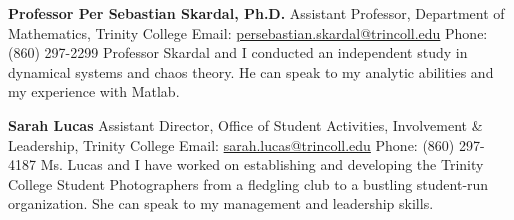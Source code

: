 \documentclass[letterpaper,10pt,oneside]{article}
\newcommand{\CVNote}{Resume compiled on {\today}}
\begin{document}
\begin{body}
\BigGapNoBreak

{\textbf{Professor Per Sebastian Skardal, Ph.D.}}
\hfill
\GapNoBreak
\BulletItem
Assistant Professor, Department of Mathematics, Trinity College
\BulletItem
Email: \href{mailto:persebastian.skardal@trincoll.edu}{persebastian.skardal@trincoll.edu}
\BulletItem
Phone: (860) 297-2299
\BulletItem
Professor Skardal and I conducted an independent study in dynamical systems and chaos theory. He can speak to my analytic abilities and my experience with Matlab.

\BigGapNoBreak

{\textbf{Sarah Lucas}}
\hfill
\GapNoBreak
\BulletItem
Assistant Director, Office of Student Activities, Involvement \& Leadership, Trinity College
\BulletItem
Email: \href{mailto:sarah.lucas@trincoll.edu}{sarah.lucas@trincoll.edu}
\BulletItem
Phone: (860) 297-4187
\BulletItem
Ms. Lucas and I have worked on establishing and developing the Trinity College Student Photographers from a fledgling club to a bustling student-run organization. She can speak to my management and leadership skills.


\begin{comment}
\noindent\hrulefill
\section
{Personal\newline References}
{References}
{PDF:References}

{\textbf{Christopher Reader}}
\hfill
\GapNoBreak
\BulletItem
Self-Employed Photographer
\BulletItem
Email: \href{mailto:hopelessdfilms@gmail.com}{hopelessdfilms@gmail.com}
\BulletItem
Phone: (630) 333-3797
\BulletItem
Mr. Reader has served as a mentor and photography coach for many years. He and I have worked at the Illinois Mathematics and Science Academy together to expand access to multimedia resources for all students. He can speak to my entrepreneurial drive and my technology skills.
\end{comment}
\end{body}


\begin{flushright}
\UseNoteFont
\hspace{2.0mm}\null
\end{flushright}
\end{document}
